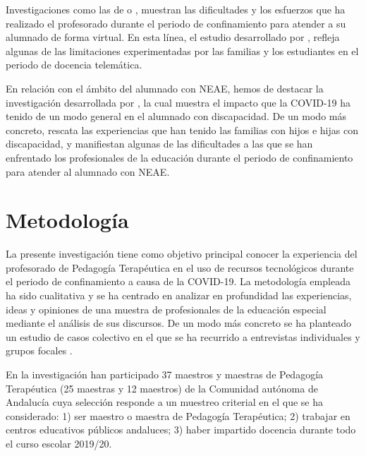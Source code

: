 \documentclass[spanish]{textolivre}
\begin{document}
Investigaciones como las de \textcite{fernandezdomingues2020} %
o \textcite{tosso2020}, %
muestran las dificultades y los esfuerzos que ha realizado el profesorado durante el periodo de confinamiento para atender a su alumnado de forma virtual. En esta línea, el estudio desarrollado por \textcite{diez2020}, %
refleja algunas de las limitaciones experimentadas por las familias y los estudiantes en el periodo de docencia telemática.

En relación con el ámbito del alumnado con NEAE, hemos de destacar la investigación desarrollada por \textcite{vega2020}, %
la cual muestra el impacto que la COVID-19 ha tenido de un modo general en el alumnado con discapacidad. De un modo más concreto, \textcite{rodriguez2020} %
rescata las experiencias que han tenido las familias con hijos e hijas con discapacidad, y \textcite{menendez2020} %
manifiestan algunas de las dificultades a las que se han enfrentado los profesionales de la educación durante el periodo de confinamiento para atender al alumnado con NEAE.

\section{Metodología}
La presente investigación tiene como objetivo principal conocer la experiencia del profesorado de Pedagogía Terapéutica en el uso de recursos tecnológicos durante el periodo de confinamiento a causa de la COVID-19. La metodología empleada ha sido cualitativa \cite{denzin2005} %
y se ha centrado en analizar en profundidad las experiencias, ideas y opiniones de una muestra de profesionales de la educación especial mediante el análisis de sus discursos. De un modo más concreto se ha planteado un estudio de casos colectivo \cite{stake1998} %
en el que se ha recurrido a entrevistas individuales \cite{ruiz2009} %
y grupos focales \cite{yin2009}. %

En la investigación han participado 37 maestros y maestras de Pedagogía Terapéutica (25 maestras y 12 maestros) de la Comunidad autónoma de Andalucía cuya selección responde a un muestreo criterial en el que se ha considerado: 1) ser maestro o maestra de Pedagogía Terapéutica; 2) trabajar en centros educativos públicos andaluces; 3) haber impartido docencia durante todo el curso escolar 2019/20.
\end{document}
